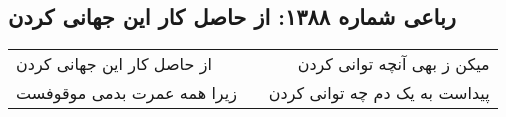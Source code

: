 \begin{center}
\section*{رباعی شماره ۱۳۸۸: از حاصل کار این جهانی کردن}
\label{sec:1388}
\begin{longtable}{l p{0.5cm} r}
از حاصل کار این جهانی کردن
&&
میکن ز بهی آنچه توانی کردن
\\
زیرا همه عمرت بدمی موقوفست
&&
پیداست به یک دم چه توانی کردن
\\
\end{longtable}
\end{center}
